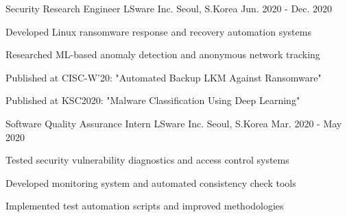 \begin{cventries}
\cventry
    {Security Research Engineer} %
    {LSware Inc.} %
    {Seoul, S.Korea} %
    {Jun. 2020 - Dec. 2020} %
    {
      \begin{cvitems} %
        \item {Developed Linux ransomware response and recovery automation systems}
        \item {Researched ML-based anomaly detection and anonymous network tracking}
        \item {Published at CISC-W'20: "Automated Backup LKM Against Ransomware"}
        \item {Published at KSC2020: "Malware Classification Using Deep Learning"}
      \end{cvitems}
    }

\cventry
    {Software Quality Assurance Intern} %
    {LSware Inc.} %
    {Seoul, S.Korea} %
    {Mar. 2020 - May 2020} %
    {
      \begin{cvitems} %
        \item {Tested security vulnerability diagnostics and access control systems}
        \item {Developed monitoring system and automated consistency check tools}
        \item {Implemented test automation scripts and improved methodologies}
      \end{cvitems}
    }

\end{cventries}